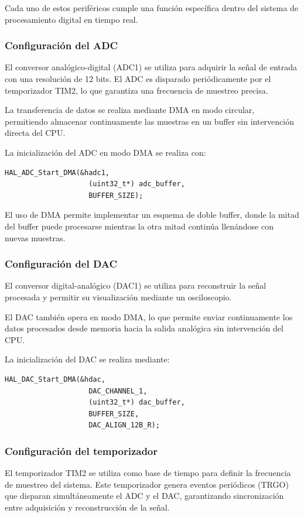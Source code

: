 \documentclass[12pt]{article}
\begin{document}
	Cada uno de estos periféricos cumple una función específica dentro del sistema de procesamiento digital en tiempo real.

	\subsubsection{Configuración del ADC}
	El conversor analógico-digital (ADC1) se utiliza para adquirir la señal de entrada con una resolución de 12 bits. El ADC es disparado periódicamente por el temporizador TIM2, lo que garantiza una frecuencia de muestreo precisa.

	La transferencia de datos se realiza mediante DMA en modo circular, permitiendo almacenar continuamente las muestras en un buffer sin intervención directa del CPU.

	La inicialización del ADC en modo DMA se realiza con:

	\begin{lstlisting}[style=mystyle]
	HAL_ADC_Start_DMA(&hadc1,
					(uint32_t*) adc_buffer,
					BUFFER_SIZE);
	\end{lstlisting}

	El uso de DMA permite implementar un esquema de doble buffer, donde la mitad del buffer puede procesarse mientras la otra mitad continúa llenándose con nuevas muestras.

	\subsubsection{Configuración del DAC}
	El conversor digital-analógico (DAC1) se utiliza para reconstruir la señal procesada y permitir su visualización mediante un osciloscopio.

	El DAC también opera en modo DMA, lo que permite enviar continuamente los datos procesados desde memoria hacia la salida analógica sin intervención del CPU.

	La inicialización del DAC se realiza mediante:

	\begin{lstlisting}[style=mystyle]
	HAL_DAC_Start_DMA(&hdac,
					DAC_CHANNEL_1,
					(uint32_t*) dac_buffer,
					BUFFER_SIZE,
					DAC_ALIGN_12B_R);
	\end{lstlisting}

	\subsubsection{Configuración del temporizador}
	El temporizador TIM2 se utiliza como base de tiempo para definir la frecuencia de muestreo del sistema. Este temporizador genera eventos periódicos (TRGO) que disparan simultáneamente el ADC y el DAC, garantizando sincronización entre adquisición y reconstrucción de la señal.
\end{document}
